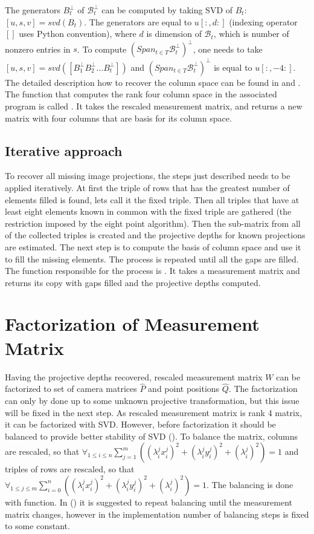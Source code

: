 \documentclass[12pt]{article}
\begin{document}
The generators $B_t^\bot$ of $\mathcal{B}_t^\bot$ can be computed by taking SVD
of $B_t$: $[u, s, v] = svd(B_t)$. The generators are equal to $u[:, d:]$
(indexing operator $[]$ uses Python convention), where $d$ is dimension of
$\mathcal{B}_t$, which is number of nonzero entries in $s$. To compute $(Span_{t
\in T} \mathcal{B}_t^\bot)^\bot$, one needs to take $[u, s, v] = svd([B_1^\bot
B_2^\bot \dots B_t^\bot])$ and $(Span_{t \in T} \mathcal{B}_t^\bot)^\bot$ is
equal to $u[:, -4:]$. The detailed description how to recover the column space
can be found in \cite{jacobs99} and \cite{svoboda04}. The function that computes
the rank four column space in the associated program is called
. It takes the rescaled measurement matrix, and
returns a new matrix with four columns that are basis for its column space.

\subsection{Iterative approach}

To recover all missing image projections, the
steps just described needs to be applied iteratively. At first the triple of
rows that has the greatest number of elements filled is found, lets call it the
fixed triple. Then all triples that have at least eight elements known in common
with the fixed triple are gathered (the restriction imposed by the eight point
algorithm). Then the sub-matrix from all of the collected triples is created and
the projective depths for known projections are estimated. The next step is to
compute the basis of column space and use it to fill the missing elements. The
process is repeated until all the gaps are filled. The function responsible for
the process is . It takes a measurement matrix
 and returns its copy with gaps filled and the projective depths
computed.

\section{Factorization of Measurement Matrix}

Having the projective depths
recovered, rescaled measurement matrix $W$ can be factorized to set of camera
matrices $\hat{P}$ and point positions $\hat{Q}$. The factorization can only by
done up to some unknown projective transformation, but this issue will be fixed
in the next step. As rescaled measurement matrix is rank 4 matrix, it can be
factorized with SVD. However, before factorization it should be balanced to
provide better stability of SVD (\cite{sturm96}). To balance the matrix, columns
are rescaled, so that $\forall_{1 \leq i \leq n} \sum_{j=1}^m \left( (\lambda
_i^j x_i^j)^2 + (\lambda _i^j y_i^j)^2 + (\lambda _i^j)^2 \right) = 1$ and
triples of rows are rescaled, so that $\forall_{1 \leq j \leq m} \sum_{i=0}^n
\left( (\lambda _i^j x_i^j)^2 + (\lambda _i^j y_i^j)^2 + (\lambda _i^j)^2
\right) = 1$. The balancing is done with 
function. In (\cite{sturm96}) it is suggested to repeat balancing until the
measurement matrix  changes, however in the implementation number of balancing
steps is fixed to some constant.
\end{document}
